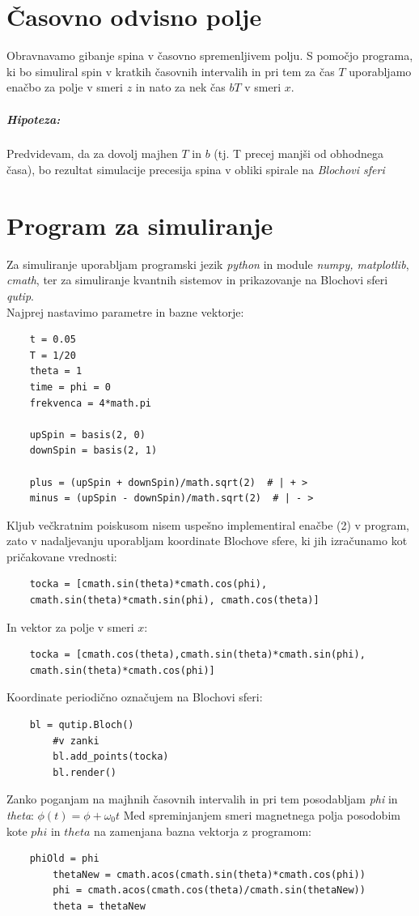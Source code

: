 \documentclass[12pt, a4paper]{article}
\begin{document}
\section{Časovno odvisno polje}
Obravnavamo gibanje spina v časovno spremenljivem polju. S pomočjo programa, ki bo simuliral spin v kratkih časovnih intervalih in pri tem za čas $T$ uporabljamo enačbo za polje v smeri $z$ in nato za nek čas $bT$ v smeri $x$. 
\subparagraph{Hipoteza:}
Predvidevam, da za dovolj majhen $T$ in $b$ (tj. T precej manjši od obhodnega časa), bo rezultat simulacije precesija spina v obliki spirale na \textit{Blochovi sferi}

\section{Program za simuliranje}
Za simuliranje uporabljam programski jezik \textit{python} in module \textit{numpy, matplotlib}, \textit{cmath}, ter za simuliranje kvantnih sistemov in prikazovanje na Blochovi sferi \textit{qutip}.\\
Najprej nastavimo parametre in bazne vektorje:
\lstset{language=Python} 
\begin{lstlisting}
	t = 0.05
	T = 1/20
	theta = 1
	time = phi = 0
	frekvenca = 4*math.pi 

	upSpin = basis(2, 0)
	downSpin = basis(2, 1)

	plus = (upSpin + downSpin)/math.sqrt(2)  # | + >
	minus = (upSpin - downSpin)/math.sqrt(2)  # | - >
\end{lstlisting}
Kljub večkratnim poiskusom nisem uspešno implementiral enačbe (2) v program, zato v nadaljevanju uporabljam koordinate Blochove sfere, ki jih izračunamo kot pričakovane vrednosti:
\begin{lstlisting}
	tocka = [cmath.sin(theta)*cmath.cos(phi), 
	cmath.sin(theta)*cmath.sin(phi), cmath.cos(theta)]
\end{lstlisting}
In vektor za polje v smeri $x$:
\begin{lstlisting}
	tocka = [cmath.cos(theta),cmath.sin(theta)*cmath.sin(phi),
	cmath.sin(theta)*cmath.cos(phi)]
\end{lstlisting}
Koordinate periodično označujem na Blochovi sferi:
\begin{lstlisting}
	bl = qutip.Bloch()
		#v zanki	
		bl.add_points(tocka)
    	bl.render() 
\end{lstlisting}
Zanko poganjam na majhnih časovnih intervalih in pri tem posodabljam \textit{phi} in \textit{theta}: $\phi(t) = \phi + \omega_0t$
Med spreminjanjem smeri magnetnega polja posodobim kote $phi$ in $theta$ na zamenjana bazna vektorja z programom:
\begin{lstlisting}
	phiOld = phi
    	thetaNew = cmath.acos(cmath.sin(theta)*cmath.cos(phi))
    	phi = cmath.acos(cmath.cos(theta)/cmath.sin(thetaNew))
    	theta = thetaNew
\end{lstlisting}
\end{document}
